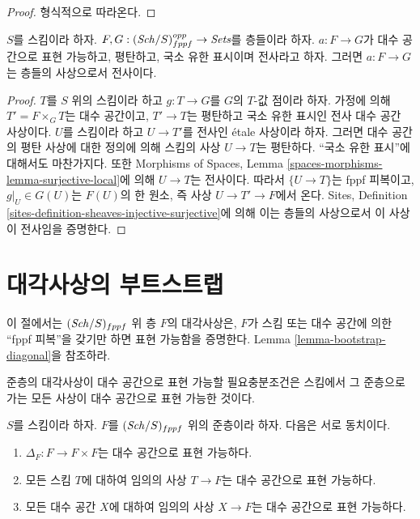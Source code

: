 \begin{proof}
형식적으로 따라온다.
\end{proof}

\begin{lemma}
\label{lemma-surjective-flat-locally-finite-presentation}
$S$를 스킴이라 하자.
$F, G : (\mathit{Sch}/S)_{fppf}^{opp} \to \textit{Sets}$를 층들이라 하자.
$a : F \to G$가 대수 공간으로 표현 가능하고, 평탄하고, 국소 유한
표시이며 전사라고 하자. 그러면 $a : F \to G$는 층들의 사상으로서
전사이다.
\end{lemma}

\begin{proof}
$T$를 $S$ 위의 스킴이라 하고 $g : T \to G$를 $G$의 $T$-값 점이라
하자. 가정에 의해 $T' = F \times_G T$는 대수 공간이고,
$T' \to T$는 평탄하고 국소 유한 표시인 전사 대수 공간 사상이다.
$U$를 스킴이라 하고 $U \to T'$를 전사인 \'etale 사상이라 하자.
그러면 대수 공간의 평탄 사상에 대한 정의에 의해 스킴의 사상
$U \to T$는 평탄하다. ``국소 유한 표시''에 대해서도 마찬가지다.
또한 Morphisms of Spaces, Lemma
\ref{spaces-morphisms-lemma-surjective-local}에 의해 $U \to T$는 전사이다.
따라서 $\{U \to T\}$는 fppf 피복이고, $g|_U \in G(U)$는 $F(U)$의
한 원소, 즉 사상 $U \to T' \to F$에서 온다. Sites, Definition
\ref{sites-definition-sheaves-injective-surjective}에 의해 이는 층들의
사상으로서 이 사상이 전사임을 증명한다.
\end{proof}


\section{대각사상의 부트스트랩}
\label{section-bootstrap-diagonal}

\noindent
이 절에서는 $(\mathit{Sch}/S)_{fppf}$ 위 층 $F$의 대각사상은, $F$가 스킴 또는
대수 공간에 의한 ``fppf 피복''을 갖기만 하면 표현 가능함을 증명한다.
Lemma \ref{lemma-bootstrap-diagonal}을 참조하라.

\begin{lemma}
\label{lemma-representable-diagonal}
\begin{slogan}
준층의 대각사상이 대수 공간으로 표현 가능할 필요충분조건은 스킴에서
그 준층으로 가는 모든 사상이 대수 공간으로 표현 가능한 것이다.
\end{slogan}
$S$를 스킴이라 하자.
$F$를 $(\mathit{Sch}/S)_{fppf}$ 위의 준층이라 하자. 다음은 서로 동치이다.
\begin{enumerate}
\item $\Delta_F : F \to F \times F$는 대수 공간으로 표현 가능하다.
\item 모든 스킴 $T$에 대하여 임의의 사상 $T \to F$는 대수 공간으로
표현 가능하다.
\item 모든 대수 공간 $X$에 대하여 임의의 사상 $X \to F$는 대수
공간으로 표현 가능하다.
\end{enumerate}
\end{lemma}

